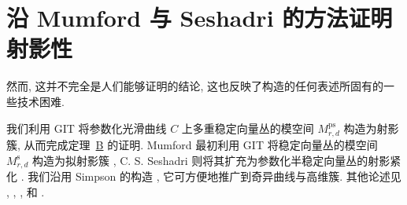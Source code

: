 \section{沿 Mumford 与 Seshadri 的方法证明射影性}\label{src:9.5}
\begin{epigraph}
然而, 这并不完全是人们能够证明的结论, 这也反映了构造的任何表述所固有的一些技术困难.
\end{epigraph}
我们利用 GIT 将参数化光滑曲线 $C$ 上多重稳定向量丛的模空间 $M_{r,d}^{\mathrm{ps}}$ 构造为射影簇, 从而完成定理~\hyperref[thm:B]{B} 的证明. Mumford 最初利用 GIT 将稳定向量丛的模空间 $M_{r,d}^{\mathrm s}$ 构造为拟射影簇 \cite{Mum63}, C. S. Seshadri 则将其扩充为参数化半稳定向量丛的射影紧化 \cite{Ses67}. 我们沿用 Simpson 的构造 \cite{Sim94a}, 它可方便地推广到奇异曲线与高维簇. 其他论述见 \cite{Ses82}, \cite[\S7]{LP97}, \cite[\S4]{HL10}, \cite[\S5.4]{New78} 和 \cite[\S10]{Muk03}.
